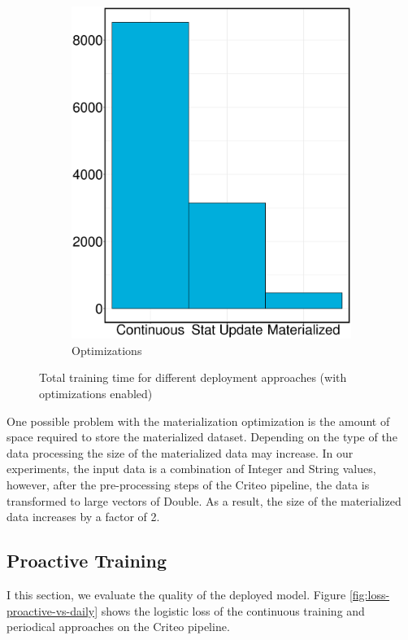 \begin{figure}[h]
\begin{subfigure}{\columnwidth/2}
\includegraphics[width=\columnwidth]{../images/experiment-results/criteo-training-time-optimizations-experiment.eps}
\caption{Optimizations}
\label{fig:training-time-optimization}
\end{subfigure}
\vspace{2mm}
\caption{Total training time for different deployment approaches (with optimizations enabled)}
\end{figure}

One possible problem with the materialization optimization is the amount of space required to store the materialized dataset.
Depending on the type of the data processing the size of the materialized data may increase.
In our experiments, the input data is a combination of Integer and String values, however, after the pre-processing steps of the Criteo pipeline, the data is transformed to large vectors of Double.
As a result, the size of the materialized data increases by a factor of 2.


\subsection{Proactive Training}
I this section, we evaluate the quality of the deployed model.
Figure \ref{fig:loss-proactive-vs-daily} shows the logistic loss of the continuous training and periodical approaches on the Criteo pipeline.

